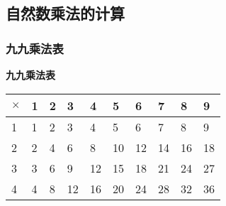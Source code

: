 \documentclass[12pt,UTF8]{ctexart}
\begin{document}
\subsection{自然数乘法的计算}

\subsubsection{九九乘法表}

\begin{center}
    
    {\LARGE \textbf{九九乘法表}}

    \begin{tabular}{ | p{2em}<{\centering} | p{2em}<{\centering} | p{2em}<{\centering} |  p{2em}<{\centering} | p{2em}<{\centering} | p{2em}<{\centering} | p{2em}<{\centering} | p{2em}<{\centering} | p{2em}<{\centering} | p{2em}<{\centering} |}
        \hline
        \cellcolor[RGB]{250,250,250}$\times$ & \phantom{0}1 & \phantom{0}2 & \phantom{0}3 & \phantom{0}4 & \phantom{0}5 & \phantom{0}6 & \phantom{0}7 & \phantom{0}8 & \phantom{0}9  \\  
        \hline
        1 & \cellcolor[RGB]{252,239,236}\phantom{0}1 & \cellcolor[RGB]{252,243,236}\phantom{0}2 & \cellcolor[RGB]{250,248,239}\phantom{0}3 & \cellcolor[RGB]{248,251,242}\phantom{0}4 & \cellcolor[RGB]{245,251,245}\phantom{0}5 & \cellcolor[RGB]{242,248,248}\phantom{0}6 & \cellcolor[RGB]{239,245,250}\phantom{0}7 & \cellcolor[RGB]{236,242,252}\phantom{0}8 & \cellcolor[RGB]{236,239,252}\phantom{0}9\\
        \hline
        2 & \cellcolor[RGB]{252,226,220}\phantom{0}2 & \cellcolor[RGB]{252,234,220}\phantom{0}4 & \cellcolor[RGB]{248,243,226}\phantom{0}6 & \cellcolor[RGB]{243,249,232}\phantom{0}8 & \cellcolor[RGB]{237,249,237}10 & \cellcolor[RGB]{232,244,243}12 & \cellcolor[RGB]{226,237,248}14 & \cellcolor[RGB]{220,231,252}16 & \cellcolor[RGB]{220,226,252}18\\
        \hline
        3 & \cellcolor[RGB]{253,214,205}\phantom{0}3 & \cellcolor[RGB]{253,226,205}\phantom{0}6 & \cellcolor[RGB]{247,239,214}\phantom{0}9 & \cellcolor[RGB]{239,248,222}12 & \cellcolor[RGB]{231,248,231}15 & \cellcolor[RGB]{222,241,239}18 & \cellcolor[RGB]{214,231,247}21 & \cellcolor[RGB]{205,221,253}24 & \cellcolor[RGB]{205,214,253}27\\
        \hline
        4 & \cellcolor[RGB]{253,200,189}\phantom{0}4 & \cellcolor[RGB]{253,216,189}\phantom{0}8 & \cellcolor[RGB]{245,234,201}12 & \cellcolor[RGB]{234,246,212}16 & \cellcolor[RGB]{223,246,223}20 & \cellcolor[RGB]{212,236,234}24 & \cellcolor[RGB]{201,223,245}28 & \cellcolor[RGB]{189,210,253}32 & \cellcolor[RGB]{189,201,253}36\\

\end{tabular}
\end{center}
\end{document}
